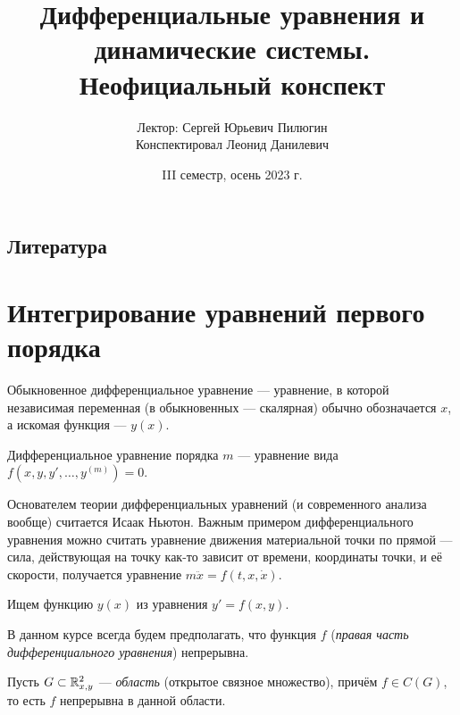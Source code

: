 \documentclass[a4paper]{report}
\date{III семестр, осень 2023 г.}
\title{Дифференциальные уравнения и динамические системы. Неофициальный конспект}
\author{Лектор: Сергей Юрьевич Пилюгин  \\ Конспектировал Леонид Данилевич}
\begin{document}
    \maketitle
    \tableofcontents
    \newpage
    \setcounter{lection}{0}


    \section*{Литература}


    \chapter{Интегрирование уравнений первого порядка}
    Обыкновенное дифференциальное уравнение --- уравнение, в которой независимая переменная (в обыкновенных --- скалярная) обычно обозначается $x$,
    а искомая функция --- $y(x)$.

    Дифференциальное уравнение порядка $m$ --- уравнение вида $f\left(x, y, y', \dots, y^{(m)}\right) = 0$.

    Основателем теории дифференциальных уравнений (и современного анализа вообще) считается Исаак Ньютон.
    Важным примером дифференциального уравнения можно считать уравнение движения материальной точки по прямой --- сила, действующая на точку как-то зависит от времени, координаты точки, и её скорости, получается уравнение $m \ddot{x} = f(t, x, \dot{x})$.


    Ищем функцию $y(x)$ из уравнения $y' = f(x, y)$.

    В данном курсе всегда будем предполагать, что функция $f$ (\emph{правая часть дифференциального уравнения}) непрерывна.

    Пусть $G \subset \mathbb{R}^2_{x,y}$ --- \emph{область} (открытое связное множество), причём $f \in C(G)$, то есть $f$ непрерывна в данной области.
\end{document}
